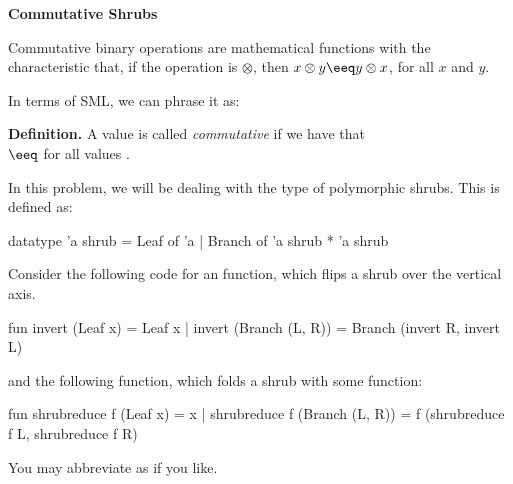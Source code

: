 
\textbf{Commutative Shrubs}

Commutative binary operations are mathematical functions with the characteristic
that, if the operation is $\otimes$, then $x \otimes y \eeq y \otimes x$, for
all $x$ and $y$.

In terms of SML, we can phrase it as:

\textbf{Definition.} A value  is called \textit{commutative} if
we have that \\
 $\eeq$  for all values .

In this problem, we will be dealing with the type of polymorphic shrubs. This is
defined as:
\begin{codeblock}
  datatype 'a shrub =
      Leaf of 'a
    | Branch of 'a shrub * 'a shrub
\end{codeblock}

Consider the following code for an  function,
which flips a shrub over the vertical axis.
\begin{codeblock}
  fun invert (Leaf x) = Leaf x
    | invert (Branch (L, R)) =
        Branch (invert R, invert L)
\end{codeblock}
and the following  function, which folds a shrub with
some function:
\begin{codeblock}
  fun shrubreduce f (Leaf x) = x
    | shrubreduce f (Branch (L, R)) =
        f (shrubreduce f L, shrubreduce f R)
\end{codeblock}

You may abbreviate  as  if you like.

